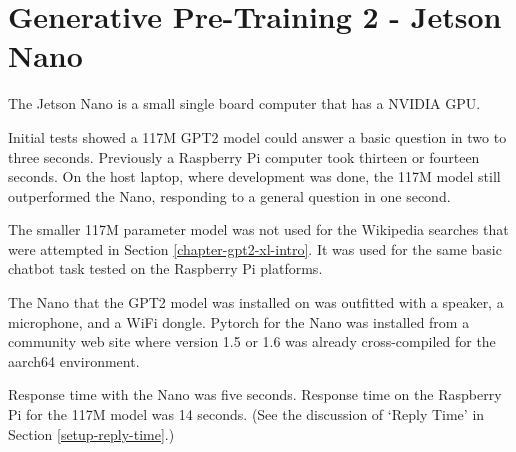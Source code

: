 \label{chapter-xlarge}

\section{Generative Pre-Training 2 - Jetson Nano}

\label{chapter-nano}
The Jetson Nano is a small single board computer that has a NVIDIA GPU. %

Initial tests showed a 117M GPT2 model could answer a basic question in two to three seconds. Previously a Raspberry Pi computer took thirteen or fourteen seconds. On the host laptop, where development was done, the 117M model still outperformed the Nano, responding to a general question in one second.

The smaller 117M parameter model was not used for the Wikipedia searches that were attempted in Section \ref{chapter-gpt2-xl-intro}. It was used for the same basic chatbot task tested on the Raspberry Pi platforms.


The Nano that the GPT2 model was installed on was outfitted with a speaker, a microphone, and a WiFi dongle. Pytorch for the Nano was installed from a community web site where version 1.5 or 1.6 was already cross-compiled for the aarch64 environment. 

Response time with the Nano was five seconds. Response time on the Raspberry Pi for the 117M model was 14 seconds. (See the discussion of `Reply Time' in Section \ref{setup-reply-time}.)
